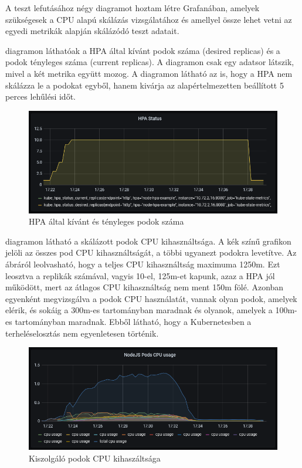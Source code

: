 \documentclass[a4paper,oneside]{article}
\begin{document}
A teszt lefutásához négy diagramot hoztam létre Grafanában, amelyek
szükségesek a CPU alapú skálázás vizsgálatához és amellyel össze lehet vetni
az egyedi metrikák alapján skálázódó teszt adatait.


 diagramon láthatóak a HPA által kívánt podok száma (desired
replicas) és a podok tényleges száma (current replicas).  A diagramon csak
egy adatsor látszik, mivel a két metrika együtt mozog.  A diagramon látható
az is, hogy a HPA nem skálázza le a podokat egyből, hanem kivárja az
alapértelmezetten beállított 5 perces lehűlési időt.

\begin{figure}[H]
  \centering
  \includegraphics[width=\textwidth]{light_cpu_hpa.PNG}
  \caption{HPA által kívánt és tényleges podok száma}
  \label{light_cpu_hpa}  
\end{figure}

 diagramon látható a skálázott podok CPU kihasználtsága.  A kék
színű grafikon jelöli az összes pod CPU kihasználtságát, a többi ugyanezt
podokra levetítve.  Az ábráról leolvasható, hogy a teljes CPU kihasználtság
maximuma 1250m.  Ezt leosztva a replikák számával, vagyis 10-el, 125m-et
kapunk, azaz a HPA jól működött, mert az átlagos CPU kihasználtság nem ment
150m fölé. Azonban egyenként megvizsgálva a podok CPU használatát, vannak
olyan podok, amelyek elérik, és sokáig a 300m-es tartományban maradnak és
olyanok, amelyek a 100m-es tartományban maradnak.  Ebből látható, hogy a
Kubernetesben a terheléselosztás nem egyenletesen történik.

\begin{figure}[H]
  \centering
  \includegraphics[width=\textwidth]{light_cpu_cpu.PNG}
  \caption{Kiszolgáló podok CPU kihaszáltsága}
  \label{light_cpu_cpu}  
\end{figure}
\end{document}
